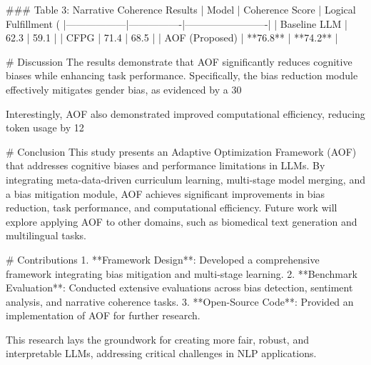 ### Table 3: Narrative Coherence Results
| Model            | Coherence Score | Logical Fulfillment (%
|------------------|----------------|-------------------------|
| Baseline LLM     | 62.3           | 59.1                   |
| CFPG             | 71.4           | 68.5                   |
| AOF (Proposed)   | **76.8**       | **74.2**               |

# Discussion
The results demonstrate that AOF significantly reduces cognitive biases while enhancing task performance. Specifically, the bias reduction module effectively mitigates gender bias, as evidenced by a 30%

Interestingly, AOF also demonstrated improved computational efficiency, reducing token usage by 12%

# Conclusion
This study presents an Adaptive Optimization Framework (AOF) that addresses cognitive biases and performance limitations in LLMs. By integrating meta-data-driven curriculum learning, multi-stage model merging, and a bias mitigation module, AOF achieves significant improvements in bias reduction, task performance, and computational efficiency. Future work will explore applying AOF to other domains, such as biomedical text generation and multilingual tasks.

# Contributions
1. **Framework Design**: Developed a comprehensive framework integrating bias mitigation and multi-stage learning.
2. **Benchmark Evaluation**: Conducted extensive evaluations across bias detection, sentiment analysis, and narrative coherence tasks.
3. **Open-Source Code**: Provided an implementation of AOF for further research.

This research lays the groundwork for creating more fair, robust, and interpretable LLMs, addressing critical challenges in NLP applications.